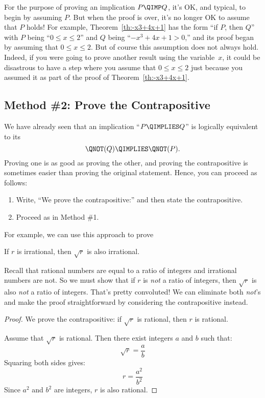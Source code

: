 For the purpose of proving an implication $P \QIMP Q$, it's OK, and
typical, to begin by assuming $P$.  But when the proof is over, it's
no longer OK to assume that $P$ holds!  For example,
Theorem~\ref{th:-x3+4x+1} has the form ``if $P$, then $Q$'' with $P$
being ``$0 \le x \le 2$'' and $Q$ being ``$-x^3 + 4x + 1 > 0$,'' and
its proof began by assuming that $0 \le x \le 2$.  But of course this
assumption does not always hold.  Indeed, if you were going to prove
another result using the variable~$x$, it could be disastrous to have
a step where you assume that $0 \le x \le 2$ just because you assumed
it as part of the proof of Theorem~\ref{th:-x3+4x+1}.

\subsection{Method \#2: Prove the Contrapositive}\label{sec:contrapositive}

We have already seen that an implication ``$P \QIMPLIES Q$'' is
logically equivalent to its 
\[
\QNOT(Q) \QIMPLIES \QNOT(P).
\]
Proving one is as good as proving the other, and proving the
contrapositive is sometimes easier than proving the original statement.
Hence, you can proceed as follows:
%
\begin{enumerate}
\item Write, ``We prove the contrapositive:'' and then state the
contrapositive.
\item Proceed as in Method \#1.
\end{enumerate}

For example, we can use this approach to prove
\begin{theorem}
If $r$ is irrational, then $\sqrt{r}$ is also irrational.
\end{theorem}

Recall that rational numbers are equal to a ratio of integers and
irrational numbers are not.  So we must show that if $r$ is \emph{not} a
ratio of integers, then $\sqrt{r}$ is also \emph{not} a ratio of
integers.  That's pretty convoluted!  We can eliminate both \emph{not}'s
and make the proof straightforward by considering the contrapositive
instead.

\begin{proof}
We prove the contrapositive: if $\sqrt{r}$ is rational, then $r$ is
rational.

Assume that $\sqrt{r}$ is rational.  Then there exist integers $a$ and $b$
such that:
%
\[
\sqrt{r} = \frac{a}{b}
\]
%
Squaring both sides gives:
%
\[
r  = \frac{a^2}{b^2}
\]
%
Since $a^2$ and $b^2$ are integers, $r$ is also rational.
\end{proof}

